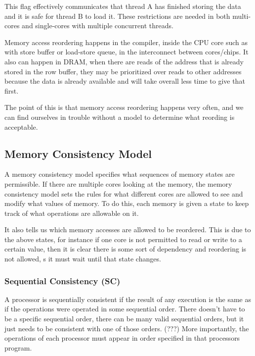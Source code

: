 \documentclass{article}
\begin{document}
This flag effectively communicates that thread A has finished storing the data and it is safe for thread B to load it. These restrictions are needed in both multi-cores and single-cores with multiple concurrent threads.

Memory access reordering happens in the compiler, inside the CPU core such as with store buffer or load-store queue, in the interconnect between cores/chips. It also can happen in DRAM, when there are reads of the address that is already stored in the row buffer, they may be prioritized over reads to other addresses because the data is already available and will take overall less time to give that first. 

The point of this is that memory access reordering happens very often, and we can find ourselves in trouble without a model to determine what reording is acceptable. 

\subsection{Memory Consistency Model}

A memory consistency model specifies what sequences of memory states are permissible. If there are multiple cores looking at the memory, the memory consistency model sets the rules for what different cores are allowed to see and modify what values of memory. To do this, each memory is given a state to keep track of what operations are allowable on it.

It also tells us which memory accesses are allowed to be reordered. This is due to the above states, for instance if one core is not permitted to read or write to a certain value, then it is clear there is some sort of dependency and reordering is not allowed, s it must wait until that state changes. 

\subsubsection{Sequential Consistency (SC)}

A processor is sequentially consistent if the result of any execution is the same as if the operations were operated in some sequential order. There doesn't have to be a specific sequential order, there can be many valid sequential orders, but it just needs to be consistent with one of those orders. (???) More importantly, the operations of each processor must appear in order specified in that processors program.
\end{document}
